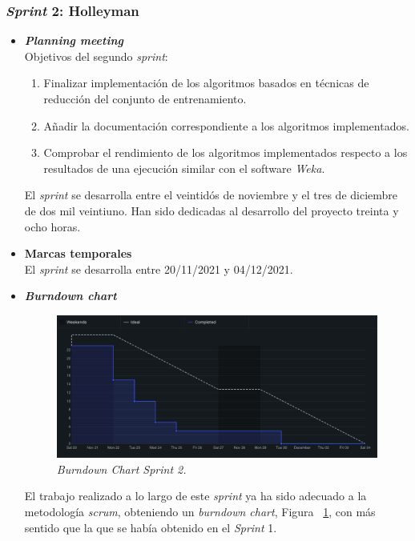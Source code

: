 \subsubsection{\textit{Sprint} 2: Holleyman}
\begin{itemize}
\item \textbf{\textit{Planning meeting}}\\
Objetivos del segundo \textit{sprint}:
\begin{enumerate}
\item Finalizar implementación de los algoritmos basados en técnicas de reducción del conjunto de entrenamiento.
\item Añadir la documentación correspondiente a los algoritmos implementados.
\item Comprobar el rendimiento de los algoritmos implementados respecto a los resultados de una ejecución similar con el software \textit{Weka}.
\end{enumerate}
El \textit{sprint} se desarrolla entre el veintidós de noviembre y el tres de diciembre de dos mil veintiuno. Han sido dedicadas al desarrollo del proyecto treinta y ocho horas.

\item \textbf{Marcas temporales}\\
El \textit{sprint} se desarrolla entre 20/11/2021 y 04/12/2021.

\item \textbf{\textit{Burndown chart}}\\
\begin{figure}
\begin{center}
\includegraphics[width=\textwidth]{../img/anexos/sprints/BD-Sprint2}
\caption{\textit{Burndown Chart Sprint 2.}}\label{fig:BD-Sprint2}
\end{center}
\end{figure}
El trabajo realizado a lo largo de este \textit{sprint} ya ha sido adecuado a la metodología \textit{scrum}, obteniendo un \textit{burndown chart}, Figura ~\ref{fig:BD-Sprint2}, con más sentido que la que se había obtenido en el \textit{Sprint } 1. 


\end{itemize}
